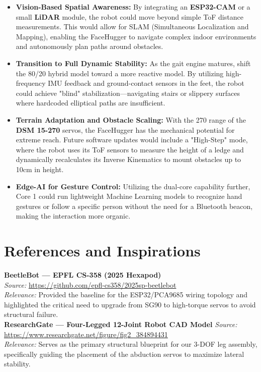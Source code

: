 \documentclass{article}
\begin{document}
\begin{itemize}
  \item \textbf{Vision-Based Spatial Awareness:} By integrating an \textbf{ESP32-CAM} or a small \textbf{LiDAR} module, the robot could move beyond simple ToF distance measurements. This would allow for SLAM (Simultaneous Localization and Mapping), enabling the FaceHugger to navigate complex indoor environments and autonomously plan paths around obstacles.

  \item \textbf{Transition to Full Dynamic Stability:} As the gait engine matures, shift the 80/20 hybrid model toward a more reactive model. By utilizing high-frequency IMU feedback and ground-contact sensors in the feet, the robot could achieve "blind" stabilization—navigating stairs or slippery surfaces where hardcoded elliptical paths are insufficient.

  \item \textbf{Terrain Adaptation and Obstacle Scaling:} With the 270\textdegree{} range of the \textbf{DSM 15-270} servos, the FaceHugger has the mechanical potential for extreme reach. Future software updates would include a "High-Step" mode, where the robot uses its ToF sensors to measure the height of a ledge and dynamically recalculates its Inverse Kinematics to mount obstacles up to 10cm in height.

  \item \textbf{Edge-AI for Gesture Control:} Utilizing the dual-core capability further, Core 1 could run lightweight Machine Learning models to recognize hand gestures or follow a specific person without the need for a Bluetooth beacon, making the interaction more organic.
\end{itemize}

\section{References and Inspirations}

\textbf{BeetleBot — EPFL CS-358 (2025 Hexapod)} \\
\textit{Source:} \url{https://github.com/epfl-cs358/2025sp-beetlebot} \\
\textit{Relevance:} Provided the baseline for the ESP32/PCA9685 wiring topology and highlighted the critical need to upgrade from SG90 to high-torque servos to avoid structural failure.
\\

\textbf{ResearchGate — Four-Legged 12-Joint Robot CAD Model}
\textit{Source:} \\
\url{https://www.researchgate.net/figure/fig2_384894431} \\
\textit{Relevance:} Serves as the primary structural blueprint for our 3-DOF leg assembly, specifically guiding the placement of the abduction servos to maximize lateral stability. \\
\end{document}
